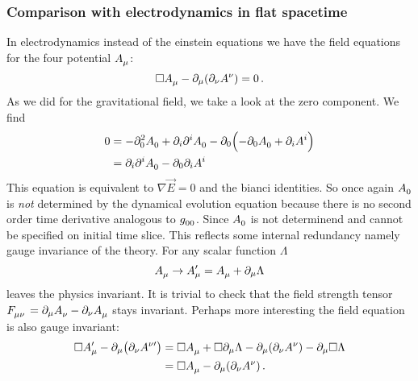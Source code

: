 \subsubsection{Comparison with electrodynamics in flat spacetime}
In electrodynamics instead of the einstein equations we have the field equations
for the four potential $\tensor{A}{_\mu}$:
\begin{equation}
\square\tensor{A}{_\mu}-\partial_\mu\left(\partial_\nu\tensor{A}{^\nu}
\right)=0\,.
\end{equation}
As we did for the gravitational field, we take a look
at the zero component. We find
\begin{equation}
\begin{split}
0&=-\partial_0^2\tensor{A}{_0}+\partial_i\partial^i\tensor{A}{_0}
-\partial_0\left(-\partial_0\tensor{A}{_0}+\partial_iA^i\right)\\
&= \partial_i\partial^i\tensor{A}{_0}-\partial_0\partial_iA^i
\end{split}
\end{equation}
This equation is equivalent to $\nabla\vec{E}=0$ and the bianci identities.
So once again $\tensor{A}{_0}$ is \emph{not} determined by the dynamical
evolution equation because there is no second order time derivative analogous to
$\tensor{g}{_0_0}$. Since $\tensor{A}{_0}$ is not determinend and cannot be
specified on initial time slice. This reflects some internal redundancy namely
gauge invariance of the theory. For any scalar function $\Lambda$
\begin{equation}
\tensor{A}{_\mu}\to\tensor*{A}{*_\mu^\prime}=
\tensor{A}{_\mu}+\partial_\mu\Lambda
\end{equation}
leaves the physics invariant. It is trivial to check that
the field strength tensor \\
${\tensor{F}{_\mu_\nu}=\partial_\mu\tensor{A}{_\nu}-\partial_\nu\tensor{A}{_\mu}}$ stays invariant. Perhaps more
interesting the field equation is also gauge invariant:
\begin{equation}
\begin{split}
\square\tensor*{A}{*_\mu^\prime}-\partial_\mu\left(\partial_\nu\tensor*{A}{*^\nu^\prime}
\right)
&=
\square\tensor{A}{_\mu}+\square\partial_\mu\Lambda-\partial_\mu\left(\partial_\nu\tensor{A}{^\nu}
\right)-\partial_\mu\square\Lambda\\
&=
\square\tensor{A}{_\mu}-\partial_\mu\left(\partial_\nu\tensor{A}{^\nu}
\right)\,.
\end{split}
\end{equation}
